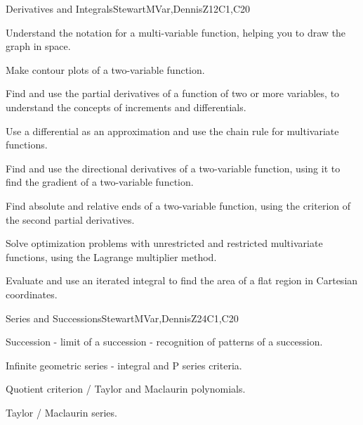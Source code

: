\begin{syllabus}
\begin{unit}{Derivatives and Integrals}{}{StewartMVar,DennisZ}{12}{C1,C20}
  \begin{learningoutcomes}
    \item Understand the notation for a multi-variable function, helping you to draw the graph in space.
    \item Make contour plots of a two-variable function.
    \item Find and use the partial derivatives of a function of two or more variables, to understand the concepts of increments and differentials.
    \item Use a differential as an approximation and use the chain rule for multivariate functions.
    \item Find and use the directional derivatives of a two-variable function, using it to find the gradient of a two-variable function.
    \item Find absolute and relative ends of a two-variable function, using the criterion of the second partial derivatives.
    \item Solve optimization problems with unrestricted and restricted multivariate functions, using the Lagrange multiplier method.
    \item Evaluate and use an iterated integral to find the area of a flat region in Cartesian coordinates.
    \end{learningoutcomes}

\end{unit}

\begin{unit}{Series and Successions}{}{StewartMVar,DennisZ}{24}{C1,C20}
   \begin{topics}
    \item Succession - limit of a succession - recognition of patterns of a succession.
    \item Infinite geometric series - integral and P series criteria.
    \item Quotient criterion / Taylor and Maclaurin polynomials.
    \item Taylor / Maclaurin series.
 \end{topics}


\end{unit}
\end{syllabus}
